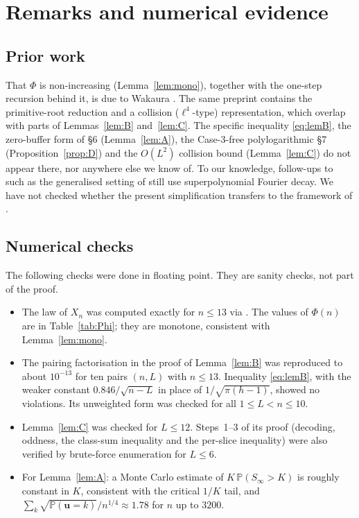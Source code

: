 \documentclass[11pt]{amsart}
\theoremstyle{remark}
\renewcommand{\P}{\mathbb{P}}
\newcommand{\T}[1]{\cite[#1]{Tao22}}   %
\newcommand{\Tc}{\cite{Tao22}}         %
\theoremstyle{plain}
\begin{document}
\section{Remarks and numerical evidence}\label{sec:remarks}

\subsection{Prior work}
That $\Phi$ is non-increasing (Lemma~\ref{lem:mono}), together with the one-step recursion behind it, is due to Wakaura \cite[Theorem~2.1(d)]{Wak26}. The same preprint contains the primitive-root reduction and a collision ($\ell^4$-type) representation, which overlap with parts of Lemmas~\ref{lem:B} and~\ref{lem:C}. The specific inequality \eqref{eq:lemB}, the zero-buffer form of \S6 (Lemma~\ref{lem:A}), the Case-3-free polylogarithmic \S7 (Proposition~\ref{prop:D}) and the $O(L^2)$ collision bound (Lemma~\ref{lem:C}) do not appear there, nor anywhere else we know of. To our knowledge, follow-ups to \Tc{} such as the generalised setting of \cite{GGM} still use superpolynomial Fourier decay. We have not checked whether the present simplification transfers to the framework of \cite{GGM}.

\subsection{Numerical checks}
The following checks were done in floating point. They are sanity checks, not part of the proof.

\begin{itemize}
\item The law of $X_n$ was computed exactly for $n\le13$ via \T{Lemma 1.12}. The values of $\Phi(n)$ are in Table~\ref{tab:Phi}; they are monotone, consistent with Lemma~\ref{lem:mono}.
\item The pairing factorisation in the proof of Lemma~\ref{lem:B} was reproduced to about $10^{-13}$ for ten pairs $(n,L)$ with $n\le13$. Inequality \eqref{eq:lemB}, with the weaker constant $0.846/\sqrt{n-L}$ in place of $1/\sqrt{\pi(h-1)}$, showed no violations. Its unweighted form was checked for all $1\le L<n\le10$.
\item Lemma~\ref{lem:C} was checked for $L\le12$. Steps~1--3 of its proof (decoding, oddness, the class-sum inequality and the per-slice inequality) were also verified by brute-force enumeration for $L\le6$.
\item For Lemma~\ref{lem:A}: a Monte Carlo estimate of $K\,\P(S_\infty>K)$ is roughly constant in $K$, consistent with the critical $1/K$ tail, and $\sum_k\sqrt{\P(\mathbf u=k)}/n^{1/4}\approx1.78$ for $n$ up to $3200$.
\end{itemize}
\end{document}
